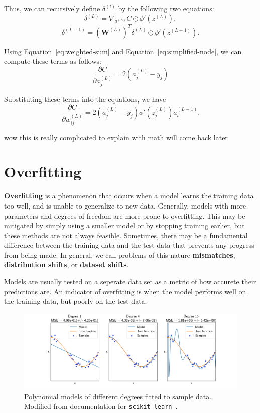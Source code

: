 \documentclass[12pt]{report}
\theoremstyle{definition}
\theoremstyle{remark}
\begin{document}
Thus, we can recursively define $\delta^{(l)}$ by the following two equations:
\begin{equation}
    \delta^{(L)} = \nabla_{a^{(L)}}C \odot \phi'(z^{(L)}),
\end{equation}
\begin{equation}
    \delta^{(L-1)} = {\left(\mathbf{W}^{(L)}\right)}^T \delta^{(L)} \odot \phi'(z^{(L-1)}).
\end{equation}

Using Equation~\ref{eq:weighted-sum} and Equation~\ref{eq:simplified-node}, we can compute these terms as follows:
\begin{equation}
    \frac{\partial C}{\partial a_j^{(L)}} = 2(a_j^{(L)} - y_j)
\end{equation}

Substituting these terms into the equations, we have
\begin{equation}
    \frac{\partial C}{\partial w_{ij}^{(L)}} = 2(a_j^{(L)} - y_j) \phi'(z_j^{(L)}) a_i^{(L-1)}.
\end{equation}

wow this is really complicated to explain with math will come back later

\section{Overfitting}\label{sec:overfitting}
\textbf{Overfitting} is a phenomenon that occurs when a model learns the training data too well, and is unable to generalize to new data. Generally, models with more parameters and degrees of freedom are more prone to overfitting. This may be mitigated by simply using a smaller model or by stopping training earlier, but these methods are not always feasible. Sometimes, there may be a fundamental difference between the training data and the test data that prevents any progress from being made. In general, we call problems of this nature \textbf{mismatches}, \textbf{distribution shifts}, or \textbf{dataset shifts}.

Models are usually tested on a seperate data set as a metric of how accurete their predictions are. An indicator of overfitting is when the model performs well on the training data, but poorly on the test data.

\begin{figure}[h]
    \centering
    \includegraphics[width=\linewidth]{figs/underfitting_overfitting.png}
    \caption{Polynomial models of different degrees fitted to sample data. Modified from documentation for \texttt{scikit-learn}~\cite{pedregosa_scikit-learn_2011}.}
    \label{fig:overfitting}
\end{figure}
\end{document}
